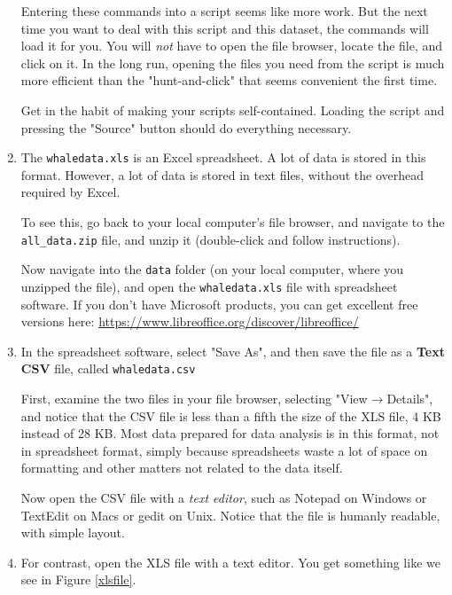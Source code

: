 \documentclass[12pt]{article}
\newcommand{\arrow}{\ensuremath{\rightarrow}}
\begin{document}
\begin{enumerate}
Entering these commands into a script seems like more work.  But the
next time you want to deal with this script and this dataset, the commands
will load it for you.  You will {\em not} have to open the file browser,
locate the file, and click on it.  In the long run, opening the files you
need from the script is much more efficient than the "hunt-and-click"
that seems convenient the first time.

Get in the habit of making your scripts self-contained.  Loading
the script and pressing the "Source" button should do everything
necessary.

\item
The \verb|whaledata.xls| is an Excel spreadsheet.  A lot of data is stored in 
this format.  However, a lot of data is stored in text files, without the overhead
required by Excel.  

To see this, go back to your local computer's file browser, and navigate to
the \verb|all_data.zip| file, and unzip it (double-click and follow instructions).

Now navigate into the \verb|data| folder (on your local computer, where you
unzipped the file), and open the \verb|whaledata.xls| file with spreadsheet
software.  If you don't have Microsoft products, you can get excellent free
versions here: \url{https://www.libreoffice.org/discover/libreoffice/}

\item
In the spreadsheet software, select "Save As", and then save the file as a
{\bf Text CSV} file, called \verb|whaledata.csv|

First, examine the two files in your file browser, selecting "View\arrow Details",
and notice that the CSV file is less than a fifth the size of the XLS file,
4 KB instead of 28 KB.  Most data prepared for data analysis is in this format,
not in spreadsheet format, simply because spreadsheets waste a lot of space
on formatting and other matters not related to the data itself.

Now open the CSV file with a {\em text editor}, such as Notepad on Windows
or TextEdit on Macs or gedit on Unix.  Notice that the file is humanly readable,
with simple layout. 


\item
For contrast, open the XLS file with a text editor.  You get something like we see
in Figure \ref{xlsfile}.  


\end{enumerate}
\end{document}
